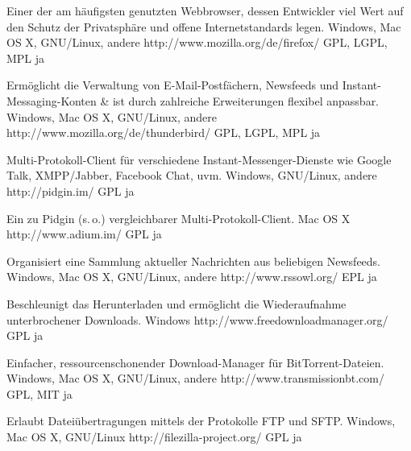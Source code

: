 




{Einer der am häufigsten genutzten Webbrowser, dessen Entwickler viel Wert auf den Schutz der Privatsphäre und offene Internetstandards legen.}
{Windows, Mac OS X, GNU/Linux, andere}
{http://www.mozilla.org/de/firefox/}
{GPL, LGPL, MPL}
{ja}

{Ermöglicht die Verwaltung von E-Mail-Postfächern, Newsfeeds und Instant-Messaging-Konten \& ist durch zahlreiche Erweiterungen flexibel anpassbar.}
{Windows, Mac OS X, GNU/Linux, andere}
{http://www.mozilla.org/de/thunderbird/}
{GPL, LGPL, MPL}
{ja}

{Multi-Protokoll-Client für verschiedene Instant-Messenger-Dienste wie \mbox{Google} Talk, XMPP/Jabber, Facebook Chat, uvm.}
{Windows, GNU/Linux, andere}
{http://pidgin.im/}
{GPL}
{ja}

{Ein zu Pidgin (s.\,o.) vergleichbarer Multi-Protokoll-Client.}
{Mac OS X}
{http://www.adium.im/}
{GPL}
{ja}

{Organisiert eine Sammlung aktueller Nachrichten aus beliebigen Newsfeeds.}
{Windows, Mac OS X, GNU/Linux, andere}
{http://www.rssowl.org/}
{EPL}
{ja}

{Beschleunigt das Herunterladen und ermöglicht die Wiederaufnahme unterbrochener Downloads.}
{Windows}
{http://www.freedownloadmanager.org/}
{GPL}
{ja}

{Einfacher, ressourcenschonender Download-Manager für BitTorrent-Dateien.}
{Windows, Mac OS X, GNU/Linux, andere}
{http://www.transmissionbt.com/}
{GPL, MIT}
{ja}

{Erlaubt Dateiübertragungen mittels der Protokolle FTP und SFTP.}
{Windows, Mac OS X, GNU/Linux}
{http://filezilla-project.org/}
{GPL}
{ja}

\backpage


